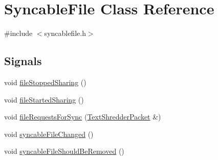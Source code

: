 \hypertarget{class_syncable_file}{
\section{SyncableFile Class Reference}
\label{class_syncable_file}
}


{\ttfamily \#include $<$syncablefile.h$>$}

\subsection*{Signals}
\begin{DoxyCompactItemize}
\item 
void \hyperlink{class_syncable_file_a6f7d3887c7178af437011a3739528aa4}{fileStoppedSharing} ()
\item 
void \hyperlink{class_syncable_file_aa6f791c9ba6b6a334fb812049703a06f}{fileStartedSharing} ()
\item 
void \hyperlink{class_syncable_file_af7e647ff2106c70dd088ba925796fa18}{fileRequestsForSync} (\hyperlink{class_text_shredder_packet}{TextShredderPacket} \&)
\item 
void \hyperlink{class_syncable_file_a13cc1700a5695b1cce76848d1741cc25}{syncableFileChanged} ()
\item 
void \hyperlink{class_syncable_file_abd42e21e8c7e9c886d85675e1796580e}{syncableFileShouldBeRemoved} ()
\end{DoxyCompactItemize}
